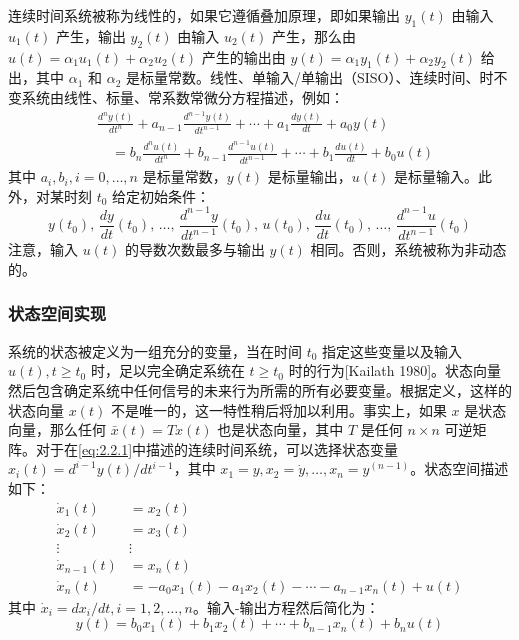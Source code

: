 \documentclass[UTF8,12pt,a4paper]{ctexart}
\theoremstyle{definition}
\begin{document}
连续时间系统被称为线性的，如果它遵循叠加原理，即如果输出 $y_1(t)$ 由输入 $u_1(t)$ 产生，输出 $y_2(t)$ 由输入 $u_2(t)$ 产生，那么由 $u(t)=\alpha_1 u_1(t)+\alpha_2 u_2(t)$ 产生的输出由 $y(t)=\alpha_1 y_1(t)+\alpha_2 y_2(t)$ 给出，其中 $\alpha_1$ 和 $\alpha_2$ 是标量常数。线性、单输入/单输出（SISO）、连续时间、时不变系统由线性、标量、常系数常微分方程描述，例如：
\begin{equation}\label{eq:2.2.1}
\begin{aligned}
&\frac{d^n y(t)}{dt^n} + a_{n-1}\frac{d^{n-1}y(t)}{dt^{n-1}} + \cdots + a_1\frac{dy(t)}{dt} + a_0y(t) \\
&\quad = b_n\frac{d^n u(t)}{dt^n} + b_{n-1}\frac{d^{n-1}u(t)}{dt^{n-1}} + \cdots + b_1\frac{du(t)}{dt} + b_0u(t)
\end{aligned}
\end{equation}
其中 $a_i, b_i, i=0,\ldots,n$ 是标量常数，$y(t)$ 是标量输出，$u(t)$ 是标量输入。此外，对某时刻 $t_0$ 给定初始条件：
\begin{equation}
y(t_0),\, \frac{dy}{dt}(t_0),\, \ldots,\, \frac{d^{n-1}y}{dt^{n-1}}(t_0),\, u(t_0),\, \frac{du}{dt}(t_0),\, \ldots,\, \frac{d^{n-1}u}{dt^{n-1}}(t_0)
\end{equation}
注意，输入 $u(t)$ 的导数次数最多与输出 $y(t)$ 相同。否则，系统被称为非动态的。

\subsubsection{状态空间实现}

系统的状态被定义为一组充分的变量，当在时间 $t_0$ 指定这些变量以及输入 $u(t), t \geq t_0$ 时，足以完全确定系统在 $t \geq t_0$ 时的行为[Kailath 1980]。状态向量然后包含确定系统中任何信号的未来行为所需的所有必要变量。根据定义，这样的状态向量 $x(t)$ 不是唯一的，这一特性稍后将加以利用。事实上，如果 $x$ 是状态向量，那么任何 $\bar{x}(t)=Tx(t)$ 也是状态向量，其中 $T$ 是任何 $n \times n$ 可逆矩阵。对于在\eqref{eq:2.2.1}中描述的连续时间系统，可以选择状态变量 $x_i(t) = d^{i-1}y(t)/dt^{i-1}$，其中 $x_1=y, x_2=\dot{y}, \ldots, x_n=y^{(n-1)}$。状态空间描述如下：
\begin{equation}\label{eq:2.2.2}
\begin{aligned}
\dot{x}_1(t) &= x_2(t) \\
\dot{x}_2(t) &= x_3(t) \\
\vdots & \vdots \\
\dot{x}_{n-1}(t) &= x_n(t) \\
\dot{x}_n(t) &= -a_0x_1(t) - a_1x_2(t) - \cdots - a_{n-1}x_n(t) + u(t)
\end{aligned}
\end{equation}
其中 $\dot{x}_i = dx_i/dt, i=1,2,\ldots,n$。输入-输出方程然后简化为：
\begin{equation}\label{eq:2.2.3}
y(t) = b_0 x_1(t) + b_1 x_2(t) + \cdots + b_{n-1} x_n(t) + b_n u(t)
\end{equation}
\end{document}
